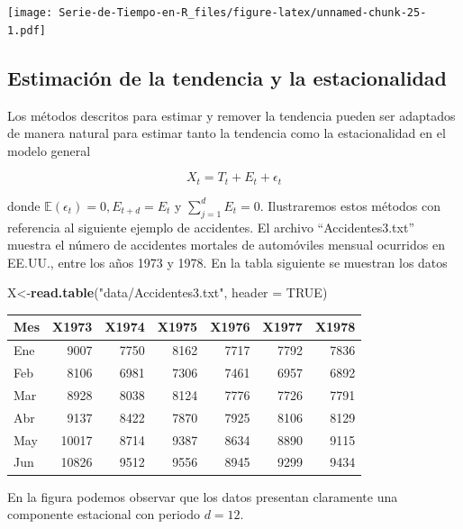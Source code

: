 \documentclass[12pt,]{krantz}
\makeatletter
\newenvironment{Shaded}{\begin{snugshade}}{\end{snugshade}}
\newcommand{\KeywordTok}[1]{\textcolor[rgb]{0.13,0.29,0.53}{\textbf{#1}}}
\newcommand{\DataTypeTok}[1]{\textcolor[rgb]{0.13,0.29,0.53}{#1}}
\newcommand{\StringTok}[1]{\textcolor[rgb]{0.31,0.60,0.02}{#1}}
\newcommand{\OtherTok}[1]{\textcolor[rgb]{0.56,0.35,0.01}{#1}}
\newcommand{\NormalTok}[1]{#1}
\newenvironment{kframe}{%
\medskip{}
\setlength{\fboxsep}{.8em}
 \def\at@end@of@kframe{}%
 \ifinner\ifhmode%
  \def\at@end@of@kframe{\end{minipage}}%
  \begin{minipage}{\columnwidth}%
 \fi\fi%
 \def\FrameCommand##1{\hskip\@totalleftmargin \hskip-\fboxsep
 \colorbox{shadecolor}{##1}\hskip-\fboxsep
     \hskip-\linewidth \hskip-\@totalleftmargin \hskip\columnwidth}%
 \MakeFramed {\advance\hsize-\width
   \@totalleftmargin\z@ \linewidth\hsize
   \@setminipage}}%
 {\par\unskip\endMakeFramed%
 \at@end@of@kframe}
\renewenvironment{Shaded}{\begin{kframe}}{\end{kframe}}
\theoremstyle{definition}
\theoremstyle{definition}
\theoremstyle{definition}
\theoremstyle{remark}
\makeatother
\begin{document}
\texttt{[image: Serie-de-Tiempo-en-R\_files/figure-latex/unnamed-chunk-25-1.pdf]}

\subsection{Estimación de la tendencia y la
estacionalidad}\label{estimacion-de-la-tendencia-y-la-estacionalidad}

Los métodos descritos para estimar y remover la tendencia pueden ser
adaptados de manera natural para estimar tanto la tendencia como la
estacionalidad en el modelo general

\begin{equation}
X_t = T_t + E_t + \epsilon_t
\end{equation}

donde \(\mathbb{E}(\epsilon_t)=0, E_{t+d}=E_t\) y \(\sum_{j=1}^dE_t=0\).
Ilustraremos estos métodos con referencia al siguiente ejemplo de
accidentes. El archivo ``Accidentes3.txt'' muestra el número de
accidentes mortales de automóviles mensual ocurridos en EE.UU., entre
los años 1973 y 1978. En la tabla siguiente se muestran los datos

\begin{Shaded}
\begin{Highlighting}[]
\NormalTok{X<-}\KeywordTok{read.table}\NormalTok{(}\StringTok{"data/Accidentes3.txt"}\NormalTok{, }\DataTypeTok{header =} \OtherTok{TRUE}\NormalTok{)}
\end{Highlighting}
\end{Shaded}

\begin{tabular}{l|r|r|r|r|r|r}
\hline
Mes & X1973 & X1974 & X1975 & X1976 & X1977 & X1978\\
\hline
Ene & 9007 & 7750 & 8162 & 7717 & 7792 & 7836\\
\hline
Feb & 8106 & 6981 & 7306 & 7461 & 6957 & 6892\\
\hline
Mar & 8928 & 8038 & 8124 & 7776 & 7726 & 7791\\
\hline
Abr & 9137 & 8422 & 7870 & 7925 & 8106 & 8129\\
\hline
May & 10017 & 8714 & 9387 & 8634 & 8890 & 9115\\
\hline
Jun & 10826 & 9512 & 9556 & 8945 & 9299 & 9434\\
\hline
\end{tabular}

En la figura podemos observar que los datos presentan claramente una
componente estacional con periodo \(d=12\).
\end{document}
